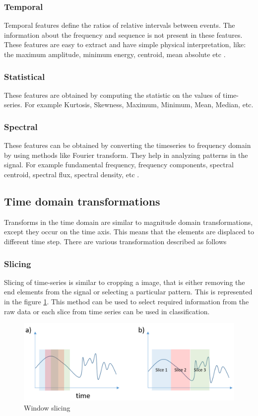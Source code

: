         \subsubsection{Temporal} 
        Temporal features define the ratios of relative intervals between events. The information about the frequency and sequence is not present in these features. These features are easy to extract and have simple physical interpretation, like: the maximum amplitude, minimum energy, centroid, mean absolute etc \cite{CakaNebi}.
         \subsubsection{Statistical} 
         These features are obtained by computing the statistic on the values of time-series. For example Kurtosis, Skewness, Maximum, Minimum, Mean, Median, etc.
         
          \subsubsection{Spectral} 
          These features can be obtained by converting the timeseries to frequency domain by using methods like Fourier transform. They help in analyzing patterns in the signal. For example fundamental frequency, frequency components, spectral centroid, spectral flux, spectral density, etc \cite{CakaNebi}.
        
    \subsection{Time domain transformations}
    Transforms in the time domain are similar to magnitude domain transformations, except they occur on the time axis. This means that the elements are displaced to different time step. There are various transformation described as follows
    
   
    
    \subsubsection{Slicing}
    Slicing of time-series is similar to cropping a image, that is either removing the end elements from the signal or selecting a particular pattern. This is represented in the figure \ref{l1}.
    This method can be used to select required information from the raw data or each slice from time series can be used in classification.
    
    \begin{figure}[h]
    	\centering
    	\includegraphics[width=0.75\linewidth]{images/MgfEa.png}
    	\caption{Window slicing \cite{le2016data}}
    	\label{l1}
    \end{figure}
    
